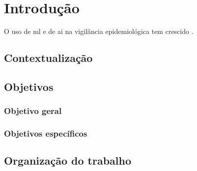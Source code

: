 \chapter{Introdução}
\label{cap:introducao}

\lipsum[1]

O uso de \gls{ml} e de \gls{ai} na vigilância epidemiológica tem crescido \cite{Suppa2022,Lahmiri2019}. \lipsum[2][1-3]

\section{Contextualização}
\lipsum[2-3]

\section{Objetivos}
\lipsum[3-4]

\subsection{Objetivo geral}
\lipsum[6]

\subsection{Objetivos específicos}
\lipsum[7]

\section{Organização do trabalho}
\lipsum[4-5]
